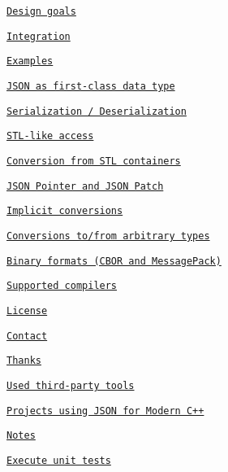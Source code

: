 \href{https://github.com/nlohmann/json/releases}{\tt }

\href{https://travis-ci.org/nlohmann/json}{\tt } \href{https://ci.appveyor.com/project/nlohmann/json}{\tt } \href{https://coveralls.io/r/nlohmann/json}{\tt } \href{https://scan.coverity.com/projects/nlohmann-json}{\tt } \href{https://www.codacy.com/app/nlohmann/json?utm_source=github.com&amp;utm_medium=referral&amp;utm_content=nlohmann/json&amp;utm_campaign=Badge_Grade}{\tt } \href{http://melpon.org/wandbox/permlink/nv9fOg0XVVhWmFFy}{\tt } \href{http://nlohmann.github.io/json}{\tt } \href{https://raw.githubusercontent.com/nlohmann/json/master/LICENSE.MIT}{\tt } \href{https://github.com/nlohmann/json/releases}{\tt } \href{http://github.com/nlohmann/json/issues}{\tt } \href{http://isitmaintained.com/project/nlohmann/json}{\tt } \href{https://bestpractices.coreinfrastructure.org/projects/289}{\tt }


\begin{DoxyItemize}
\item \href{#design-goals}{\tt Design goals}
\item \href{#integration}{\tt Integration}
\item \href{#examples}{\tt Examples}
\begin{DoxyItemize}
\item \href{#json-as-first-class-data-type}{\tt J\+S\+ON as first-\/class data type}
\item \href{#serialization--deserialization}{\tt Serialization / Deserialization}
\item \href{#stl-like-access}{\tt S\+T\+L-\/like access}
\item \href{#conversion-from-stl-containers}{\tt Conversion from S\+TL containers}
\item \href{#json-pointer-and-json-patch}{\tt J\+S\+ON Pointer and J\+S\+ON Patch}
\item \href{#implicit-conversions}{\tt Implicit conversions}
\item \href{#arbitrary-types-conversions}{\tt Conversions to/from arbitrary types}
\item \href{#binary-formats-cbor-and-messagepack}{\tt Binary formats (C\+B\+OR and Message\+Pack)}
\end{DoxyItemize}
\item \href{#supported-compilers}{\tt Supported compilers}
\item \href{#license}{\tt License}
\item \href{#contact}{\tt Contact}
\item \href{#thanks}{\tt Thanks}
\item \href{#used-third-party-tools}{\tt Used third-\/party tools}
\item \href{#projects-using-json-for-modern-c}{\tt Projects using J\+S\+ON for Modern C++}
\item \href{#notes}{\tt Notes}
\item \href{#execute-unit-tests}{\tt Execute unit tests}
\end{DoxyItemize}

